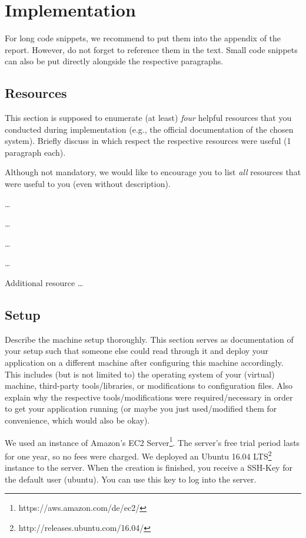 \newpage
\section{Implementation}

For long code snippets, we recommend to put them into the appendix of the
report. However, do not forget to reference them in the text. Small code
snippets can also be put directly alongside the respective paragraphs.

\subsection{Resources}

This section is supposed to enumerate (at least) \emph{four} helpful resources
that you conducted during implementation (e.g., the official documentation of
the chosen system). Briefly discuss in which respect the respective resources
were useful (1 paragraph each).

Although not mandatory, we would like to encourage you to list \emph{all}
resources that were useful to you (even without description).

\begin{packed_enum}
   \item \ldots
   \item \ldots
   \item \ldots
   \item \ldots
   \item Additional resource \ldots
\end{packed_enum}

\subsection{Setup}

Describe the machine setup thoroughly. This section serves as documentation of
your setup such that someone else could read through it and deploy your
application on a different machine after configuring this machine accordingly.
This includes (but is not limited to) the operating system of your (virtual)
machine, third-party tools/libraries, or modifications to configuration files.
Also explain why the respective tools/modifications were required/necessary in
order to get your application running (or maybe you just used/modified them for
convenience, which would also be okay).


We used an instance of Amazon's EC2 Server\footnote{https://aws.amazon.com/de/ec2/}. The server's free trial period lasts for one year, so no fees were charged. We deployed an Ubuntu 16.04 LTS\footnote{http://releases.ubuntu.com/16.04/} instance to the server. When the creation is finished, you receive a SSH-Key for the default user (ubuntu). You can use this key to log into the server.

